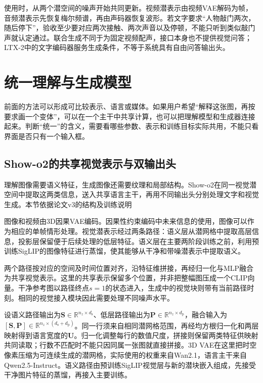 使用时，从两个潜空间的噪声开始共同更新。视频潜表示由视频VAE解码为帧，音频潜表示先恢复梅尔频谱，再由声码器恢复波形。若文字要求“人物敲门两次，随后停下”，验收至少要对应两次接触、两次声音以及停顿，不能只听到类似敲门声就认定通过。联合生成不同于为固定视频配声，接口本身也不提供视觉问答；LTX-2中的文字编码器服务生成条件，不等于系统具有自由问答输出头。

\section{统一理解与生成模型}
\label{sec:vision-models-unified}

前面的方法可以形成可比较表示、语言或媒体。如果用户希望“解释这张图，再按要求画一个变体”，可以在一个主干中共享计算，也可以把理解模型和生成器连接起来。判断“统一”的含义，需要看哪些参数、表示和训练目标实际共用，不能只看界面是否只有一个输入框。

\subsection{Show-o2的共享视觉表示与双输出头}
\label{sec:vision-models-showo2}

理解图像需要语义特征，生成图像还需要纹理和局部结构。Show-o2在同一视觉潜空间中提取这两类信息，送入共享语言主干，再用不同输出头分别处理文字和视觉生成。本节依据论文v3的结构及训练说明

图像和视频由3D因果VAE编码。因果性约束编码中未来信息的使用，图像可以作为相应的单帧情形处理。视觉潜表示经过两条路径：语义层从潜网格中提取高层信息，投影层保留便于后续处理的低层特征。语义层在主要两阶段训练之前，利用预训练SigLIP的图像特征进行蒸馏，使其能够从干净和带噪潜表示中提取语义。

两个路径按对应的空间及时间位置对齐，沿特征维拼接，再经归一化与MLP融合为共享视觉表示。这里的共享表示保留多个位置，并非把整幅图压成一个CLIP向量。干净参考图以路径终点$s=1$的状态进入，生成中的视觉块则带有当前路径时刻。相同的视觉接入模块因此需要处理不同噪声水平。

设语义路径输出为$\bm S\in\mathbb R^{n_z\times d_{\mathrm s}}$、低层路径输出为$\bm P\in\mathbb R^{n_z\times d_{\mathrm p}}$，融合输入为$[\bm S,\bm P]\in\mathbb R^{n_z\times(d_{\mathrm s}+d_{\mathrm p})}$。同一行须来自相同潜网格范围，再经均方根归一化和两层映射得到语言宽度的$\bm U$。归一化调整每行的数值尺度，拼接则保留两类特征供映射共同读取；行数不匹配时不能只因同属一张图就直接拼接。3D VAE在这里把时空像素压缩为可连续生成的潜网格，实际使用的权重来自Wan2.1，语言主干来自Qwen2.5-Instruct。语义路径由预训练SigLIP视觉层与新的潜块嵌入组成，先接受干净图片特征的蒸馏，再接入主要训练。

